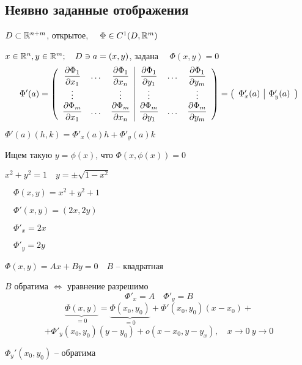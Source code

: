     \subsection*{Неявно заданные отображения}

    $D \subset \mathbb{R}^{n+m}$, открытое, $\quad \Phi \in C^1(D, \mathbb{R}^m)$
    \par $x \in \mathbb{R}^n, y \in \mathbb{R}^m; \quad 
    D \ni a = (x, y)$, задана $\quad \Phi(x, y) = 0$
    \[
        \Phi'(a) = \left(\begin{array}{c c c | c c c}
            \dfrac{\partial \Phi_1}{\partial x_1} & \dots & \dfrac{\partial \Phi_1}{\partial x_n} & \dfrac{\partial \Phi_1}{\partial y_1} & \dots & \dfrac{\partial \Phi_1}{\partial y_m} \\
            \vdots & & \vdots & \vdots & & \vdots \\
            \dfrac{\partial \Phi_m}{\partial x_1} & \dots & \dfrac{\partial \Phi_m}{\partial x_n} & \dfrac{\partial \Phi_m}{\partial y_1} & \dots & \dfrac{\partial \Phi_m}{\partial y_m} \\
        \end{array}\right) = \left(\begin{array}{c | c}
            \Phi_x'(a) & \Phi_y'(a)
        \end{array}\right)
    \]

    \par $\Phi'(a)(h, k) = \Phi'_x(a)h + \Phi'_y(a)k$
    \par Ищем такую $y = \phi(x)$, что $\Phi(x, \phi(x)) = 0$

    \begin{illustration}
        $x^2 + y^2 = 1 \quad y = \pm \sqrt{1 - x^2}$
        \par $\quad \Phi(x, y) = x^2 + y^2 + 1$
        \par $\quad \Phi'(x, y) = (2x, 2y)$
        \par $\quad \Phi'_x = 2x$
        \par $\quad \Phi'_y = 2y$
    \end{illustration}

    \begin{illustration}
        $\Phi(x, y) = Ax + By = 0 \quad B$ -- квадратная
        \par \quad $B$ обратима $\Leftrightarrow$ уравнение разрешимо
        \[
            \Phi'_x = A \quad \Phi'_y = B    
        \]
        \[
            \underbrace{\Phi(x, y)}_{=0} = \underbrace{\Phi(x_0, y_0)}_{=0} + \Phi'(x_0, y_0)(x - x_0) +    
        \]
        \[
            + \Phi'_y(x_0, y_0)(y - y_0) + o(x-x_0, y-y_x), \quad x \rightarrow 0 \ y \rightarrow 0    
        \]
        \par $\Phi_y'(x_0, y_0)$ -- обратима
    \end{illustration}

